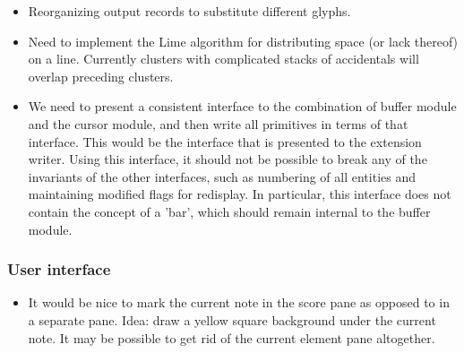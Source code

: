 \begin{itemize}
\item Reorganizing output records to substitute different glyphs. 
\item Need to implement the Lime algorithm for distributing space (or
  lack thereof) on a line.  Currently clusters with complicated stacks
  of accidentals will overlap preceding clusters. 
\item We need to present a consistent interface to the combination of 
  buffer module and the cursor module, and then write all primitives
  in terms of that interface.  This would be the interface that is
  presented to the extension writer.  Using this interface, it should
  not be possible to break any of the invariants of the other
  interfaces, such as numbering of all entities and maintaining
  modified flags for redisplay.  In particular, this interface does
  not contain the concept of a 'bar', which should remain internal to
  the buffer module.  
\end{itemize}

\subsubsection{User interface}

\begin{itemize}
\item It would be nice to mark the current note in the score pane as
  opposed to in a separate pane.  Idea: draw a yellow square
  background under the current note.  It may be possible to get rid of
  the current element pane altogether. 
\end{itemize}

